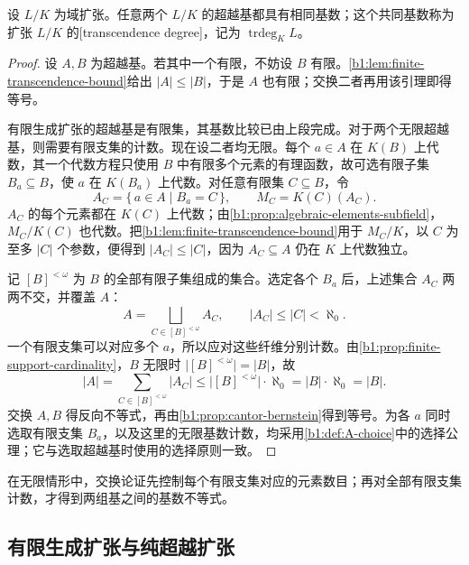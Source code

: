 \begin{theorem}\label{b1:thm:transcendence-cardinality}
	设 \(L/K\) 为域扩张。任意两个 \(L/K\) 的超越基都具有相同基数；这个共同基数称为扩张 \(L/K\) 的[transcendence degree]，记为 \(\operatorname{trdeg}_K L\)。
\end{theorem}
\begin{proof}
	设 \(A,B\) 为超越基。若其中一个有限，不妨设 \(B\) 有限。\cref{b1:lem:finite-transcendence-bound}给出 \(\lvert A\rvert\leq\lvert B\rvert\)，于是 \(A\) 也有限；交换二者再用该引理即得等号。

	有限生成扩张的超越基是有限集，其基数比较已由上段完成。对于两个无限超越基，则需要有限支集的计数。现在设二者均无限。每个 \(a\in A\) 在 \(K(B)\) 上代数，其一个代数方程只使用 \(B\) 中有限多个元素的有理函数，故可选有限子集 \(B_a\subseteq B\)，使 \(a\) 在 \(K(B_a)\) 上代数。对任意有限集 \(C\subseteq B\)，令
	\[
		A_C=\{\,a\in A\mid B_a=C\,\},\qquad M_C=K(C)(A_C).
	\]
	\(A_C\) 的每个元素都在 \(K(C)\) 上代数；由\cref{b1:prop:algebraic-elements-subfield}，\(M_C/K(C)\) 也代数。把\cref{b1:lem:finite-transcendence-bound}用于 \(M_C/K\)，以 \(C\) 为至多 \(\lvert C\rvert\) 个参数，便得到 \(\lvert A_C\rvert\leq\lvert C\rvert\)，因为 \(A_C\subseteq A\) 仍在 \(K\) 上代数独立。

	记 \([B]^{<\omega}\) 为 \(B\) 的全部有限子集组成的集合。选定各个 \(B_a\) 后，上述集合 \(A_C\) 两两不交，并覆盖 \(A\)：
	\[
		A=\bigsqcup_{C\in[B]^{<\omega}}A_C, \qquad \lvert A_C\rvert\leq\lvert C\rvert<\aleph_0.
	\]
	一个有限支集可以对应多个 \(a\)，所以应对这些纤维分别计数。由\cref{b1:prop:finite-support-cardinality}，\(B\) 无限时 \(\lvert[B]^{<\omega}\rvert=\lvert B\rvert\)，故
	\[
		\lvert A\rvert =\sum_{C\in[B]^{<\omega}}\lvert A_C\rvert \leq\lvert[B]^{<\omega}\rvert\cdot\aleph_0 =\lvert B\rvert\cdot\aleph_0 =\lvert B\rvert.
	\]
	交换 \(A,B\) 得反向不等式，再由\cref{b1:prop:cantor-bernstein}得到等号。为各 \(a\) 同时选取有限支集 \(B_a\)，以及这里的无限基数计数，均采用\cref{b1:def:A-choice}中的选择公理；它与选取超越基时使用的选择原则一致。
\end{proof}
在无限情形中，交换论证先控制每个有限支集对应的元素数目；再对全部有限支集计数，才得到两组基之间的基数不等式。

\subsection{有限生成扩张与纯超越扩张}
\label{b1:subsec:1403:03}

